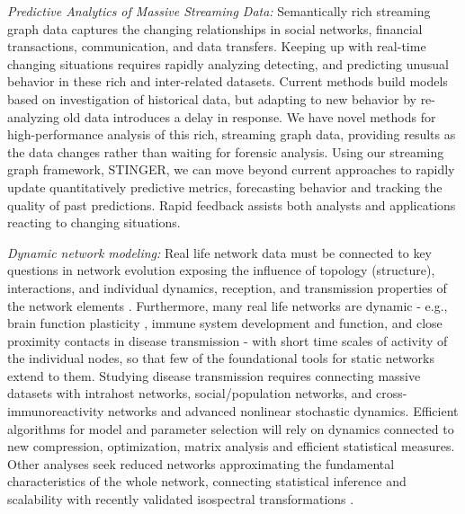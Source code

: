 \documentclass[12pt]{article}
\begin{document}
{\it Predictive Analytics of Massive Streaming Data:}
Semantically rich streaming graph data captures the changing relationships in social networks, financial transactions, communication, and data transfers.
Keeping up with real-time changing situations requires rapidly analyzing detecting, and predicting unusual behavior in these rich and inter-related datasets. Current methods build models based on investigation of historical data, but
adapting to new behavior by re-analyzing old data introduces a delay in response.
We have novel methods for high-performance analysis of this rich, streaming graph data,  providing results as the data changes rather than waiting for forensic analysis.
Using our streaming graph framework, STINGER, we can move beyond current approaches to rapidly update quantitatively predictive metrics, forecasting behavior and tracking the quality of past predictions. Rapid feedback assists both analysts and applications reacting to changing situations.


{\it Dynamic network modeling:}
Real life network data  must be connected to key questions in network evolution exposing the  influence of topology (structure), interactions, and  individual dynamics, reception, and transmission properties of the network elements \cite{afraimovich2007dynamical,bakhtin2011optimal}.
Furthermore, many real life networks are dynamic -  e.g., brain function plasticity \cite{gerstner2002spiking}, immune system development and function, and close proximity contacts in disease transmission \cite{vickisubtransmission} - with short time scales of activity of the individual nodes, so that few of the foundational tools for static networks extend to them. Studying disease transmission requires connecting massive datasets with intrahost networks, social/population networks,  and cross-immunoreactivity networks \cite{skums2015antigenic} and advanced nonlinear stochastic dynamics.
Efficient algorithms for model and parameter selection will rely on dynamics connected to new compression, optimization,  matrix analysis and efficient statistical measures.
Other analyses seek reduced networks  approximating the fundamental characteristics of the whole network, connecting statistical inference and scalability with recently validated isospectral transformations \cite{bunimovich2014isospectral}.


\end{document}
